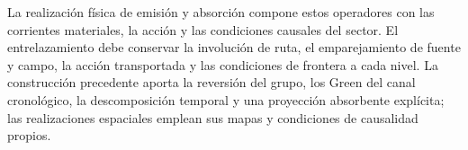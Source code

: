 La realización física de emisión y absorción compone estos operadores con
las corrientes materiales, la acción y las condiciones causales del sector.
El entrelazamiento debe conservar la involución de ruta, el emparejamiento
de fuente y campo, la acción transportada y las condiciones de frontera a
cada nivel. La construcción precedente aporta la reversión del grupo, los
Green del canal cronológico, la descomposición temporal y una proyección
absorbente explícita; las realizaciones espaciales emplean sus mapas y
condiciones de causalidad propios.
